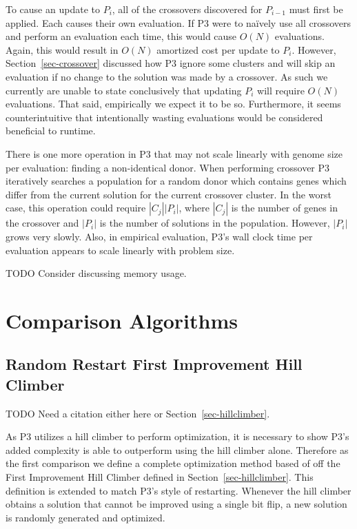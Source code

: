\documentclass{sig-alternate}
\begin{document}
To cause an update to $P_i$, all of the crossovers discovered for $P_{i-1}$ must
first be applied.  Each causes their own evaluation.  If P3 were to na\"ively use
all crossovers and perform an evaluation each time, this would cause $O(N)$ evaluations.
Again, this would result in $O(N)$ amortized cost per update to $P_i$.  However,
Section~\ref{sec-crossover} discussed how P3 ignore some clusters and will skip
an evaluation if no change to the solution was made by a crossover.  As such we currently
are unable to state conclusively that updating $P_i$ will require $O(N)$ evaluations.  That
said, empirically we expect it to be so.  Furthermore, it seems counterintuitive that
intentionally wasting evaluations would be considered beneficial to runtime.

There is one more operation in P3 that may not scale linearly with genome size per evaluation:
finding a non-identical donor.  When performing crossover P3 iteratively searches a population
for a random donor which contains genes which differ from the current solution for the current crossover
cluster.  In the worst case, this operation could require $|C_j||P_i|$, where $|C_j|$ is the number
of genes in the crossover and $|P_i|$ is the number of solutions in the population.  However, $|P_i|$ grows
very slowly.  Also, in empirical evaluation, P3's wall clock time per evaluation appears to scale linearly with
problem size.  

TODO Consider discussing memory usage.


\section{Comparison Algorithms}

\subsection{Random Restart First Improvement Hill Climber}
TODO Need a citation either here or Section~\ref{sec-hillclimber}.

As P3 utilizes a hill climber to perform optimization, it is necessary to show P3's
added complexity is able to outperform using the hill climber alone.  Therefore
as the first comparison we define a complete optimization method based of off the
First Improvement Hill Climber defined in Section~\ref{sec-hillclimber}.  This definition
is extended to match P3's style of restarting. Whenever the hill climber
obtains a solution that cannot be improved using a single bit flip, a new solution
is randomly generated and optimized.
\end{document}
